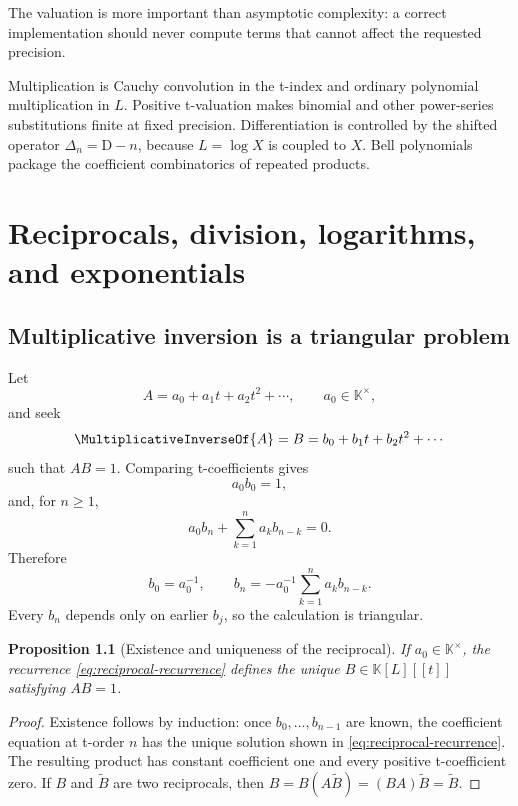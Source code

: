 \documentclass[11pt,openany]{book}
\theoremstyle{definition}
\theoremstyle{plain}
\newtheorem{proposition}{Proposition}[chapter]
\theoremstyle{remark}
\newcommand{\K}{\mathbb{K}}
\newcommand{\recip}[1]{\MultiplicativeInverseOf{#1}}
\newcommand{\Dop}{\mathrm{D}}
\begin{document}
The valuation is more important than asymptotic complexity: a correct
implementation should never compute terms that cannot affect the requested
precision.

\begin{summarybox}
Multiplication is Cauchy convolution in the t-index and ordinary polynomial
multiplication in \(L\).  Positive t-valuation makes binomial and other
power-series substitutions finite at fixed precision.  Differentiation is
controlled by the shifted operator \(\Delta_n=\Dop-n\), because
\(L=\log X\) is coupled to \(X\).  Bell polynomials package the coefficient
combinatorics of repeated products.
\end{summarybox}

\chapter{Reciprocals, division, logarithms, and exponentials}\label{ch:division}

\section{Multiplicative inversion is a triangular problem}
Let
\begin{equation}\label{eq:A-recip-general}
 A=a_0+a_1t+a_2t^2+\cdots,
 \qquad a_0\in\K^\times,
\end{equation}
and seek
\[
 \recip{A}=B=b_0+b_1t+b_2t^2+\cdots
\]
such that \(AB=1\).  Comparing t-coefficients gives
\[
 a_0b_0=1,
\]
and, for \(n\ge1\),
\[
 a_0b_n+\sum_{k=1}^n a_kb_{n-k}=0.
\]
Therefore
\begin{equation}\label{eq:reciprocal-recurrence}
 b_0=a_0^{-1},
 \qquad
 b_n=-a_0^{-1}\sum_{k=1}^n a_kb_{n-k}.
\end{equation}
Every \(b_n\) depends only on earlier \(b_j\), so the calculation is
triangular.

\begin{proposition}[Existence and uniqueness of the reciprocal]\label{prop:reciprocal}
If \(a_0\in\K^\times\), the recurrence \eqref{eq:reciprocal-recurrence}
defines the unique \(B\in\K[L][[t]]\) satisfying \(AB=1\).
\end{proposition}
\begin{proof}
Existence follows by induction: once \(b_0,\ldots,b_{n-1}\) are known, the
coefficient equation at t-order \(n\) has the unique solution shown in
\cref{eq:reciprocal-recurrence}.  The resulting product has constant
coefficient one and every positive t-coefficient zero.  If \(B\) and
\(\widetilde B\) are two reciprocals, then
\(B=B(A\widetilde B)=(BA)\widetilde B=\widetilde B\).
\end{proof}
\end{document}
